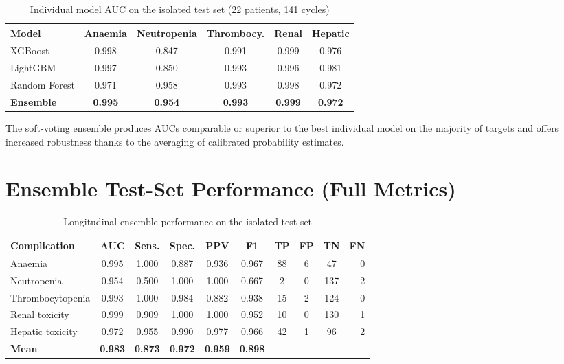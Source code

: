 \documentclass[12pt,a4paper]{report}
\begin{document}
\begin{table}[H]
\centering
\caption{Individual model AUC on the isolated test set (22 patients, 141 cycles)}
\label{tab:individual}
\begin{tabular}{lccccc}
\toprule
\textbf{Model} & \textbf{Anaemia} & \textbf{Neutropenia} & \textbf{Thrombocy.} & \textbf{Renal} & \textbf{Hepatic} \\
\midrule
XGBoost       & 0.998 & 0.847 & 0.991 & 0.999 & 0.976 \\
LightGBM      & 0.997 & 0.850 & 0.993 & 0.996 & 0.981 \\
Random Forest & 0.971 & 0.958 & 0.993 & 0.998 & 0.972 \\
\midrule
\textbf{Ensemble} & \textbf{0.995} & \textbf{0.954} & \textbf{0.993} & \textbf{0.999} & \textbf{0.972} \\
\bottomrule
\end{tabular}
\end{table}

The soft-voting ensemble produces AUCs comparable or superior to the best individual model on the majority of targets and offers increased robustness thanks to the averaging of calibrated probability estimates.

\section{Ensemble Test-Set Performance (Full Metrics)}

\begin{table}[H]
\centering
{}
\caption{Longitudinal ensemble performance on the isolated test set}
\label{tab:main}
\begin{tabular}{lccccccccr}
\toprule
\textbf{Complication} & \textbf{AUC} & \textbf{Sens.} & \textbf{Spec.} & \textbf{PPV} & \textbf{F1} & \textbf{TP} & \textbf{FP} & \textbf{TN} & \textbf{FN} \\
\midrule
Anaemia            & 0.995 & 1.000 & 0.887 & 0.936 & 0.967 & 88 & 6  & 47  & 0 \\
Neutropenia        & 0.954 & 0.500 & 1.000 & 1.000 & 0.667 & 2  & 0  & 137 & 2 \\
Thrombocytopenia   & 0.993 & 1.000 & 0.984 & 0.882 & 0.938 & 15 & 2  & 124 & 0 \\
Renal toxicity     & 0.999 & 0.909 & 1.000 & 1.000 & 0.952 & 10 & 0  & 130 & 1 \\
Hepatic toxicity   & 0.972 & 0.955 & 0.990 & 0.977 & 0.966 & 42 & 1  & 96  & 2 \\
\midrule
\rowcolor{primaryblue!10}
\textbf{Mean} & \textbf{0.983} & \textbf{0.873} & \textbf{0.972} & \textbf{0.959} & \textbf{0.898} & & & & \\
\bottomrule
\end{tabular}
\end{table}
\end{document}

